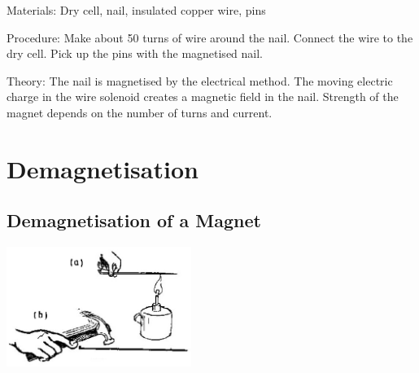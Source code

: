 \begin{multicols}{2}
\begin{description*}
\item[Materials:]{Dry cell, nail, insulated copper wire, pins}
\item[Procedure:]{Make about 50 turns of wire around the nail. Connect the wire to the dry cell. Pick up the pins with the magnetised nail.}
\item[Theory:]{The nail is magnetised by the electrical method. The moving electric charge in the wire solenoid creates a magnetic field in the nail. Strength of the magnet depends on the number of turns and current.}
\end{description*}


\section*{Demagnetisation}


\subsection{Demagnetisation of a Magnet}

\begin{center}
\includegraphics[width=0.45\textwidth]{./img/source/demagnetisation.jpg}
\end{center}


\end{multicols}
